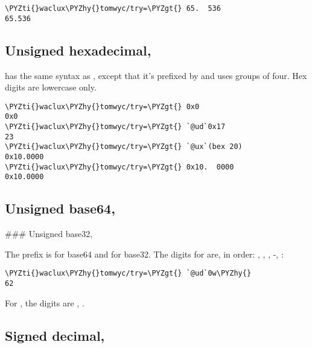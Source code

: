 \begin{framed_shaded}
\begin{Verbatim}[fontsize=\relsize{-2.5},fontseries=b,commandchars=\\\{\}]
\PYZti{}waclux\PYZhy{}tomwyc/try=\PYZgt{} 65.  536
65.536
\end{Verbatim}
\end{framed_shaded}

\subsection{Unsigned hexadecimal, }

 has the same syntax as , except that it's prefixed by 
 and uses groups of four.  Hex digits are lowercase only.

\begin{framed_shaded}
\begin{Verbatim}[fontsize=\relsize{-2.5},fontseries=b,commandchars=\\\{\}]
\PYZti{}waclux\PYZhy{}tomwyc/try=\PYZgt{} 0x0
0x0
\PYZti{}waclux\PYZhy{}tomwyc/try=\PYZgt{} `@ud`0x17
23
\PYZti{}waclux\PYZhy{}tomwyc/try=\PYZgt{} `@ux`(bex 20)
0x10.0000
\PYZti{}waclux\PYZhy{}tomwyc/try=\PYZgt{} 0x10.  0000
0x10.0000
\end{Verbatim}
\end{framed_shaded}

\subsection{Unsigned base64, }

\#\#\# Unsigned base32, 

The prefix is  for base64 and  for base32.  The digits
for  are, in order: , , , -, \sig :

\begin{framed_shaded}
\begin{Verbatim}[fontsize=\relsize{-2.5},fontseries=b,commandchars=\\\{\}]
\PYZti{}waclux\PYZhy{}tomwyc/try=\PYZgt{} `@ud`0w\PYZhy{}
62
\end{Verbatim}
\end{framed_shaded}
For , the digits are , .

\subsection{Signed decimal, }

